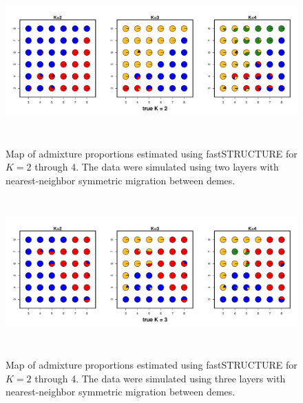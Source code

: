 \documentclass[10pt,letterpaper]{article}
\begin{document}
\begin{figure}
	\centering
		{\includegraphics[width=6in,height=2.25in]{figs/fastStr/fastStr_simK2_pies.pdf}}
	\caption{
	Map of admixture proportions estimated using fastSTRUCTURE \cite{fastStructure} for $K=2$ through 4.
	The data were simulated using two layers with nearest-neighbor symmetric migration between demes.
    }\label{fastStr_simK2}
\end{figure}

\begin{figure}
	\centering
		{\includegraphics[width=6in,height=2.25in]{figs/fastStr/fastStr_simK3_pies.pdf}}
	\caption{
	Map of admixture proportions estimated using fastSTRUCTURE \cite{fastStructure} for $K=2$ through 4.
	The data were simulated using three layers with nearest-neighbor symmetric migration between demes.
    }\label{fastStr_simK3}
\end{figure}
\end{document}
